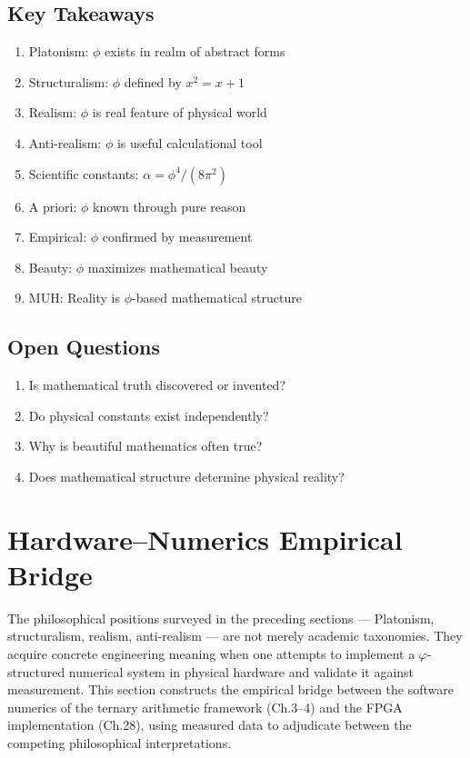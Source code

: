 \subsection*{Key Takeaways}

\begin{enumerate}
    \item Platonism: $\phi$ exists in realm of abstract forms
    \item Structuralism: $\phi$ defined by $x^2 = x + 1$
    \item Realism: $\phi$ is real feature of physical world
    \item Anti-realism: $\phi$ is useful calculational tool
    \item Scientific constants: $\alpha = \phi^4/(8\pi^2)$
    \item A priori: $\phi$ known through pure reason
    \item Empirical: $\phi$ confirmed by measurement
    \item Beauty: $\phi$ maximizes mathematical beauty
    \item MUH: Reality is $\phi$-based mathematical structure
\end{enumerate}

\subsection*{Open Questions}

\begin{enumerate}
    \item Is mathematical truth discovered or invented?
    \item Do physical constants exist independently?
    \item Why is beautiful mathematics often true?
    \item Does mathematical structure determine physical reality?
\end{enumerate}

\section{Hardware--Numerics Empirical Bridge}\label{fa_31:hw-numerics-bridge}

The philosophical positions surveyed in the preceding sections --- Platonism, structuralism, realism, anti-realism --- are not merely academic taxonomies. They acquire concrete engineering meaning when one attempts to implement a \(\varphi\)-structured numerical system in physical hardware and validate it against measurement. This section constructs the empirical bridge between the software numerics of the ternary arithmetic framework (Ch.3--4) and the FPGA implementation (Ch.28), using measured data to adjudicate between the competing philosophical interpretations.

